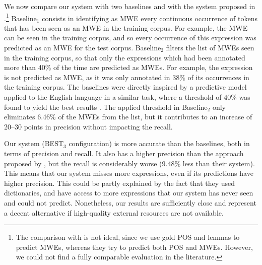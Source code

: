 \documentclass[output=paper,
modfonts
]{langscibook}
\begin{document}
We now compare our system with two baselines and with the system proposed in \citet{leroux:hal-01074298}.\footnote{The comparison with \citet{leroux:hal-01074298} is not ideal, since we use gold POS and lemmas to predict MWEs, whereas they try to predict both POS and MWEs. However, we could not find a fully comparable evaluation in the literature.} 
Baseline$_1$ consists in identifying as MWE every continuous occurrence of tokens that has been seen as an MWE in the training corpus. For example, the MWE  can be seen in the training corpus, and so every occurrence of this expression was predicted as an MWE for the test corpus.
Baseline$_2$ filters the list of MWEs seen in the training corpus, so that only the expressions which had been annotated more than 40\% of the time are predicted as MWEs. For example, the expression  is not predicted as MWE, as it was only annotated in $38\%$ of its occurrences in the training corpus. The baselines were directly inspired by a predictive model applied to the English language in a similar task, where a threshold of 40\% was found to yield the best results \citep{cordeiro-ramisch-villavicencio:2016:SemEval-dimsum}. The applied threshold in Baseline$_2$ only eliminates 6.46\% of the MWEs from the list, but it contributes to an increase of 20--30 points in precision without impacting the recall.


Our system (BEST$_3$ configuration) is more accurate than the baselines, both in terms of precision and recall. It also has a higher precision than the approach proposed by \citet{leroux:hal-01074298}, but the recall is considerably worse (9.48\% less than their system). This means that our system misses more expressions, even if its predictions have higher precision. This could be partly explained by the fact that they used dictionaries, and have access to more expressions that our system has never seen and could not predict. 
Nonetheless, our results are sufficiently close and represent a decent alternative if high-quality external resources are not available.
\end{document}
